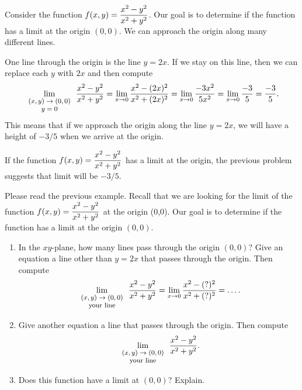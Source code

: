 \begin{example}
 Consider the function $\displaystyle f(x,y)=\frac{x^2-y^2}{x^2+y^2}$.
Our goal is to determine if the function has a limit at the origin $(0,0)$. We can approach the origin along many different lines.

One line through the origin is the line $y=2x$. If we stay on this line, then we can replace each $y$ with $2x$ and then compute
$$\displaystyle\lim_{\text{\footnotesize $\begin{array}{c}(x,y)\to(0,0)\\ y=0\end{array}$}}\frac{x^2-y^2}{x^2+y^2} 
= \lim_{x\to 0} \frac{x^2-(2x)^2}{x^2+(2x)^2}
= \lim_{x\to 0} \frac{-3x^2}{5x^2}
= \lim_{x\to 0} \frac{-3}{5}
=\frac{-3}{5}.$$
This means that if we approach the origin along the line $y=2x$, we will have a height of $-3/5$ when we arrive at the origin.
\end{example}
If the function $\displaystyle f(x,y)=\frac{x^2-y^2}{x^2+y^2}$ has a limit at the origin, the previous problem suggests that limit will be $-3/5$.
\begin{problem}
 Please read the previous example. Recall that we are looking for the limit of the function $\displaystyle f(x,y)=\frac{x^2-y^2}{x^2+y^2}$ at the origin (0,0). 
Our goal is to determine if the function has a limit at the origin $(0,0)$.
\begin{enumerate}
 \item In the $xy$-plane, how many lines pass through the origin $(0,0)$? Give an equation a line other than $y=2x$ that passes through the origin.  Then compute $$\displaystyle\lim_{\text{\footnotesize $\begin{array}{c}(x,y)\to(0,0)\\ \text{your line}\end{array}$}}\frac{x^2-y^2}{x^2+y^2}
= \lim_{x\to 0} \frac{x^2-(?)^2}{x^2+(?)^2}=\ldots.$$
 \item Give another equation a line that passes through the origin.  Then compute $$\displaystyle\lim_{\text{\footnotesize $\begin{array}{c}(x,y)\to(0,0)\\ \text{your line}\end{array}$}}\frac{x^2-y^2}{x^2+y^2}.$$
 \item Does this function have a limit at $(0,0)$? Explain. %
\end{enumerate}
\end{problem}



